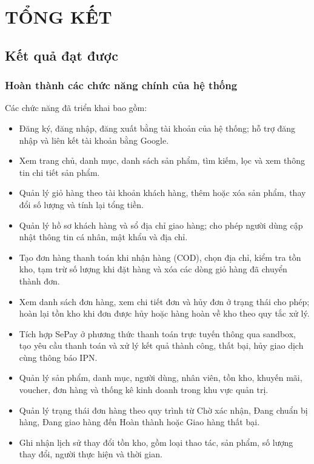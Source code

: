 \chapter{TỔNG KẾT}\label{chap4_intro}
\vspace{-40pt}

\section{Kết quả đạt được}

\subsection{Hoàn thành các chức năng chính của hệ thống}

Các chức năng đã triển khai bao gồm:
\begin{itemize}
    \item Đăng ký, đăng nhập, đăng xuất bằng tài khoản của hệ thống; hỗ trợ đăng nhập và liên kết tài khoản bằng Google.
    \item Xem trang chủ, danh mục, danh sách sản phẩm, tìm kiếm, lọc và xem thông tin chi tiết sản phẩm.
    \item Quản lý giỏ hàng theo tài khoản khách hàng, thêm hoặc xóa sản phẩm, thay đổi số lượng và tính lại tổng tiền.
    \item Quản lý hồ sơ khách hàng và sổ địa chỉ giao hàng; cho phép người dùng cập nhật thông tin cá nhân, mật khẩu và địa chỉ.
    \item Tạo đơn hàng thanh toán khi nhận hàng (COD), chọn địa chỉ, kiểm tra tồn kho, tạm trừ số lượng khi đặt hàng và xóa các dòng giỏ hàng đã chuyển thành đơn.
    \item Xem danh sách đơn hàng, xem chi tiết đơn và hủy đơn ở trạng thái cho phép; hoàn lại tồn kho khi đơn được hủy hoặc hàng hoàn về kho theo quy tắc xử lý.
    \item Tích hợp SePay ở phương thức thanh toán trực tuyến thông qua sandbox, tạo yêu cầu thanh toán và xử lý kết quả thành công, thất bại, hủy giao dịch cùng thông báo IPN.
    \item Quản lý sản phẩm, danh mục, người dùng, nhân viên, tồn kho, khuyến mãi, voucher, đơn hàng và thống kê kinh doanh trong khu vực quản trị.
    \item Quản lý trạng thái đơn hàng theo quy trình từ Chờ xác nhận, Đang chuẩn bị hàng, Đang giao hàng đến Hoàn thành hoặc Giao hàng thất bại.
    \item Ghi nhận lịch sử thay đổi tồn kho, gồm loại thao tác, sản phẩm, số lượng thay đổi, người thực hiện và thời gian.
\end{itemize}

